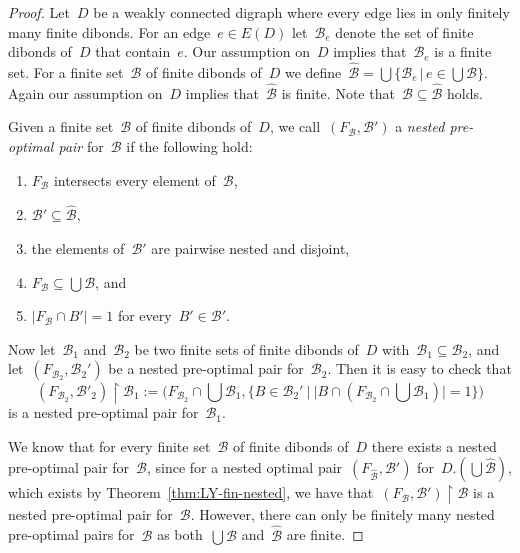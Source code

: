 \documentclass[reqno, 12pt]{amsart}
\numberwithin{equation}{section}
\numberwithin{figure}{section}
\theoremstyle{plain}
\theoremstyle{definition}
\newcommand{\restricted}{\ensuremath{{\upharpoonright}}}
\newcommand{\abs}[1]{\ensuremath{{\lvert {#1} \rvert}}}
\begin{document}
\begin{proof}
    Let~$D$ be a weakly connected digraph where every edge lies in only finitely many finite dibonds. 
    For an edge~${e \in E(D)}$ let~$\mathcal{B}_e$ denote the set of finite dibonds of~$D$ that contain~$e$. 
    Our assumption on~$D$ implies that~$\mathcal{B}_e$ is a finite set. 
    For a finite set~$\mathcal{B}$ of finite dibonds of~$D$ we define~${\hat{\mathcal{B}} = \bigcup \{ \mathcal{B}_e \, | \, e \in \bigcup \mathcal{B} \}}$. 
    Again our assumption on~$D$ implies that~$\hat{\mathcal{B}}$ is finite. 
    Note that~${\mathcal{B} \subseteq \hat{\mathcal{B}}}$ holds. 
    
    Given a finite set~$\mathcal{B}$ of finite dibonds of~$D$, we call~${(F_{\mathcal{B}}, \mathcal{B}')}$ a \emph{nested pre-optimal pair} 
    for~$\mathcal{B}$ 
    if the following hold: 
    \begin{enumerate}
        \item $F_{\mathcal{B}}$ intersects every element of~$\mathcal{B}$, 
        \item ${\mathcal{B}' \subseteq \hat{\mathcal{B}}}$, 
        \item the elements of~$\mathcal{B}'$ are pairwise nested and disjoint, 
        \item ${F_{\mathcal{B}} \subseteq \bigcup \mathcal{B}}$, and 
        \item ${\abs{F_{\mathcal{B}} \cap B'} = 1}$ for every~${B' \in \mathcal{B}'}$. 
    \end{enumerate}

    Now let~$\mathcal{B}_1$ and~$\mathcal{B}_2$ be two finite sets of finite dibonds of~$D$ with~${\mathcal{B}_1 \subseteq \mathcal{B}_2}$, and let~${(F_{\mathcal{B}_2}, \mathcal{B}_2')}$ be a nested pre-optimal pair  
    for~$\mathcal{B}_2$. 
    Then it is easy to check that 
    \[
        ( F_{\mathcal{B}_2}, \mathcal{B}'_2) \restricted \mathcal{B}_1 :=
        \Big( F_{\mathcal{B}_2} \cap \bigcup \mathcal{B}_1, 
        \big\{ B \in \mathcal{B}_2' \ |\ \abs{B \cap (F_{\mathcal{B}_2} \cap \bigcup \mathcal{B}_1)} = 1  \big\} \Big)
    \]
    is a nested pre-optimal pair 
    for~$\mathcal{B}_1$. 
    
    We know that for every finite set~$\mathcal{B}$ of finite dibonds of~$D$ there exists a nested pre-optimal pair 
    for~$\mathcal{B}$, since for a nested optimal pair~${(F_{\hat{\mathcal{B}}},\mathcal{B}')}$ for~${D.(\bigcup \hat{\mathcal{B}})}$, which exists by Theorem~\ref{thm:LY-fin-nested}, 
    we have that~${(F_\mathcal{B}, \mathcal{B}') \restricted \mathcal{B}}$
    is a nested pre-optimal pair 
    for~$\mathcal{B}$. 
    However, there can only be finitely many nested pre-optimal pairs 
    for~$\mathcal{B}$ 
    as both~${\bigcup \mathcal{B}}$ and~$\hat{\mathcal{B}}$ are finite. 
    

\end{proof}
\end{document}
